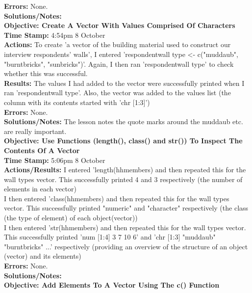 \documentclass{article}
\begin{document}
\begin{FlushLeft}
\textbf{Errors:} None.\\
\textbf{Solutions/Notes:}\\
\vspace{5mm}
\textbf{Objective: Create A Vector With Values Comprised Of Characters}\\ 
\textbf{Time Stamp:} 4:54pm 8 October\\
\textbf{Actions:} To create 'a vector of the building material used to construct our interview respondents’ walls', I entered 'respondent\textunderscore wall \textunderscore type \textless - c("muddaub", "burntbricks", "sunbricks")'. Again, I then ran 'respondent\textunderscore wall \textunderscore type' to check whether this was successful.\\
\textbf{Results:} The values I had added to the vector were successfully printed when I ran 'respondent\textunderscore wall \textunderscore type'. Also, the vector was added to the values list (the column with its contents started with 'chr [1:3]') \\
\textbf{Errors:} None.\\
\textbf{Solutions/Notes:} The lesson notes the quote marks around the muddaub etc. are really important.\\
\vspace{5mm}
\textbf{Objective: Use Functions (length(), class() and str()) To Inspect The Contents Of A Vector}\\ 
\textbf{Time Stamp:} 5:06pm 8 October\\
\textbf{Actions/Results:} I entered 'length(hh\textunderscore members) and then repeated this for the wall types vector. This successfully printed 4 and 3 respectively (the number of elements in each vector)\\
I then entered 'class(hh\textunderscore members) and then repeated this for the wall types vector. This successfully printed "numeric" and "character" respectively (the class (the type of element) of each object(vector))\\
I then entered 'str(hh\textunderscore members) and then repeated this for the wall types vector. This successfully printed 'num [1:4] 3 7 10 6' and 'chr [1:3] "muddaub" "burntbricks" ...' respectively (providing an overview of the structure of an object (vector) and its elements)\\
\textbf{Errors:} None.\\
\textbf{Solutions/Notes:}\\
\vspace{5mm}
\textbf{Objective: Add Elements To A Vector Using The c() Function}\\ 

\end{FlushLeft}
\end{document}
